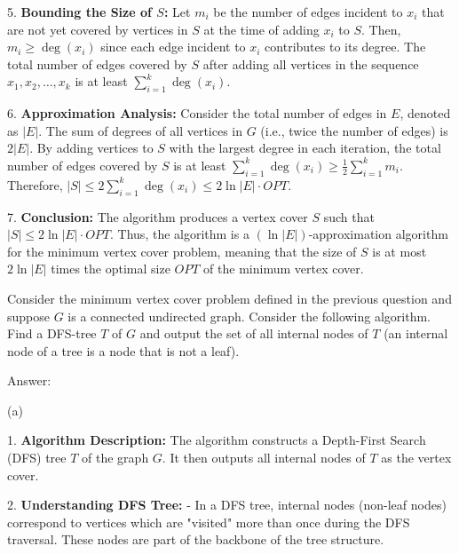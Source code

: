 \documentclass{oxmathproblems}
\begin{document}
\begin{questions}
5. \textbf{Bounding the Size of $S$:}
   Let $m_i$ be the number of edges incident to $x_i$ that are not yet covered by vertices in $S$ at the time of adding $x_i$ to $S$. 
   Then, $m_i \geq \deg(x_i)$ since each edge incident to $x_i$ contributes to its degree.
   The total number of edges covered by $S$ after adding all vertices in the sequence $x_1, x_2, \ldots, x_k$ is at least $\sum_{i=1}^k \deg(x_i)$.

6. \textbf{Approximation Analysis:}
   Consider the total number of edges in $E$, denoted as $|E|$.
   The sum of degrees of all vertices in $G$ (i.e., twice the number of edges) is $2|E|$.
   By adding vertices to $S$ with the largest degree in each iteration, the total number of edges covered by $S$ is at least $\sum_{i=1}^k \deg(x_i) \geq \frac{1}{2} \sum_{i=1}^k m_i$.
   Therefore, $|S| \leq 2 \sum_{i=1}^k \deg(x_i) \leq 2 \ln |E| \cdot OPT$.

7. \textbf{Conclusion:}
   The algorithm produces a vertex cover $S$ such that $|S| \leq 2 \ln |E| \cdot OPT$.
   Thus, the algorithm is a $(\ln |E|)$-approximation algorithm for the minimum vertex cover problem, meaning that the size of $S$ is at most $2 \ln |E|$ times the optimal size $OPT$ of the minimum vertex cover.

\miquestion[25]
Consider the minimum vertex cover problem defined in the previous question and suppose $G$ is a connected undirected graph.
Consider the following algorithm.
Find a DFS-tree $T$ of $G$ and output the set of all internal nodes of $T$ (an internal node of a tree is a node that is not a leaf).


Answer:

(a)

1. \textbf{Algorithm Description:}
   The algorithm constructs a Depth-First Search (DFS) tree \(T\) of the graph \(G\). It then outputs all internal nodes of \(T\) as the vertex cover.

2. \textbf{Understanding DFS Tree:}
   - In a DFS tree, internal nodes (non-leaf nodes) correspond to vertices which are "visited" more than once during the DFS traversal. These nodes are part of the backbone of the tree structure.


\end{questions}
\end{document}
